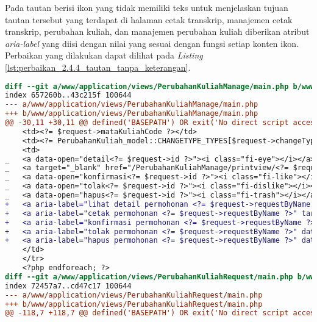 Pada tautan berisi ikon yang tidak memiliki teks untuk menjelaskan tujuan tautan tersebut yang terdapat di halaman cetak transkrip, manajemen cetak transkrip, perubahan kuliah, dan manajemen perubahan kuliah diberikan atribut \textit{aria-label} yang diisi dengan nilai yang sesuai dengan fungsi setiap konten ikon. Perbaikan yang dilakukan dapat dilihat pada \textit{Listing} \ref{lst:perbaikan_2.4.4_tautan_tanpa_keterangan}.
\begin{lstlisting}[frame=single, label={lst:perbaikan_2.4.4_tautan_tanpa_keterangan}, language=diff, caption=Perbaikan Kriteria Sukses 2.4.4]
diff --git a/www/application/views/PerubahanKuliahManage/main.php b/www/application/views/PerubahanKuliahManage/main.php
index 657260b..43c215f 100644
--- a/www/application/views/PerubahanKuliahManage/main.php
+++ b/www/application/views/PerubahanKuliahManage/main.php
@@ -30,11 +30,11 @@ defined('BASEPATH') OR exit('No direct script access allowed');
    <td><?= $request->mataKuliahCode ?></td>
    <td><?= PerubahanKuliah_model::CHANGETYPE_TYPES[$request->changeType] ?></td>
    <td>
_   <a data-open="detail<?= $request->id ?>"><i class="fi-eye"></i></a>
_   <a target="_blank" href="/PerubahanKuliahManage/printview/<?= $request->id ?>"><i class="fi-print"></i></a>
_   <a data-open="konfirmasi<?= $request->id ?>"><i class="fi-like"></i></a>                                    
_   <a data-open="tolak<?= $request->id ?>"><i class="fi-dislike"></i></a>
_   <a data-open="hapus<?= $request->id ?>"><i class="fi-trash"></i></a>
+   <a aria-label="lihat detail permohonan <?= $request->requestByName ?>" data-open="detail<?= $request->id ?>"><i class="fi-eye"></i></a>
+   <a aria-label="cetak permohonan <?= $request->requestByName ?>" target="_blank" href="/PerubahanKuliahManage/printview/<?= $request->id ?>"><i class="fi-print"></i></a>
+   <a aria-label="konfirmasi permohonan <?= $request->requestByName ?>" data-open="konfirmasi<?= $request->id ?>"><i class="fi-like"></i></a>
+   <a aria-label="tolak permohonan <?= $request->requestByName ?>" data-open="tolak<?= $request->id ?>"><i class="fi-dislike"></i></a>
+   <a aria-label="hapus permohonan <?= $request->requestByName ?>" data-open="hapus<?= $request->id ?>"><i class="fi-trash"></i></a>
    </td>
    </tr>
    <?php endforeach; ?>
diff --git a/www/application/views/PerubahanKuliahRequest/main.php b/www/application/views/PerubahanKuliahRequest/main.php
index 72457a7..cd47c17 100644
--- a/www/application/views/PerubahanKuliahRequest/main.php
+++ b/www/application/views/PerubahanKuliahRequest/main.php
@@ -118,7 +118,7 @@ defined('BASEPATH') OR exit('No direct script access allowed');

\end{lstlisting}
